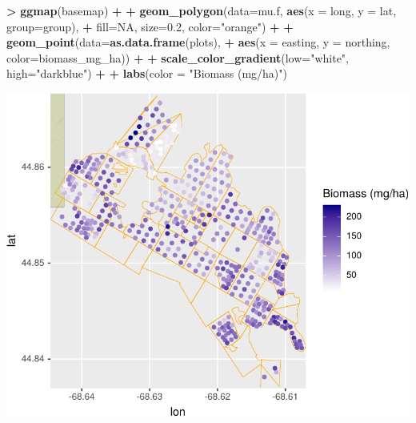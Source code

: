 \documentclass[]{krantz}
\makeatletter
\newenvironment{Shaded}{\begin{snugshade}}{\end{snugshade}}
\newcommand{\DataTypeTok}[1]{\textcolor[rgb]{0.27,0.27,0.27}{#1}}
\newcommand{\FloatTok}[1]{\textcolor[rgb]{0.06,0.06,0.06}{#1}}
\newcommand{\KeywordTok}[1]{\textcolor[rgb]{0.27,0.27,0.27}{\textbf{#1}}}
\newcommand{\NormalTok}[1]{#1}
\newcommand{\OperatorTok}[1]{\textcolor[rgb]{0.43,0.43,0.43}{\textbf{#1}}}
\newcommand{\OtherTok}[1]{\textcolor[rgb]{0.37,0.37,0.37}{#1}}
\newcommand{\StringTok}[1]{\textcolor[rgb]{0.5,0.5,0.5}{#1}}
\newenvironment{kframe}{%
\medskip{}
\setlength{\fboxsep}{.8em}
 \def\at@end@of@kframe{}%
 \ifinner\ifhmode%
  \def\at@end@of@kframe{\end{minipage}}%
  \begin{minipage}{\columnwidth}%
 \fi\fi%
 \def\FrameCommand##1{\hskip\@totalleftmargin \hskip-\fboxsep
 \colorbox{shadecolor}{##1}\hskip-\fboxsep
     \hskip-\linewidth \hskip-\@totalleftmargin \hskip\columnwidth}%
 \MakeFramed {\advance\hsize-\width
   \@totalleftmargin\z@ \linewidth\hsize
   \@setminipage}}%
 {\par\unskip\endMakeFramed%
 \at@end@of@kframe}
\renewenvironment{Shaded}{\begin{kframe}}{\end{kframe}}
\makeatother
\begin{document}
\begin{Shaded}
\begin{Highlighting}[]
\OperatorTok{>}\StringTok{ }\KeywordTok{ggmap}\NormalTok{(basemap) }\OperatorTok{+}
\OperatorTok{+}\StringTok{     }\KeywordTok{geom_polygon}\NormalTok{(}\DataTypeTok{data=}\NormalTok{mu.f, }\KeywordTok{aes}\NormalTok{(}\DataTypeTok{x =}\NormalTok{ long, }\DataTypeTok{y =}\NormalTok{ lat, }\DataTypeTok{group=}\NormalTok{group), }
\OperatorTok{+}\StringTok{                  }\DataTypeTok{fill=}\OtherTok{NA}\NormalTok{, }\DataTypeTok{size=}\FloatTok{0.2}\NormalTok{, }\DataTypeTok{color=}\StringTok{"orange"}\NormalTok{) }\OperatorTok{+}
\OperatorTok{+}\StringTok{     }\KeywordTok{geom_point}\NormalTok{(}\DataTypeTok{data=}\KeywordTok{as.data.frame}\NormalTok{(plots), }
\OperatorTok{+}\StringTok{                }\KeywordTok{aes}\NormalTok{(}\DataTypeTok{x =}\NormalTok{ easting, }\DataTypeTok{y =}\NormalTok{ northing, }\DataTypeTok{color=}\NormalTok{biomass_mg_ha)) }\OperatorTok{+}\StringTok{ }
\OperatorTok{+}\StringTok{     }\KeywordTok{scale_color_gradient}\NormalTok{(}\DataTypeTok{low=}\StringTok{"white"}\NormalTok{, }\DataTypeTok{high=}\StringTok{"darkblue"}\NormalTok{) }\OperatorTok{+}
\OperatorTok{+}\StringTok{     }\KeywordTok{labs}\NormalTok{(}\DataTypeTok{color =} \StringTok{"Biomass (mg/ha)"}\NormalTok{)}
\end{Highlighting}
\end{Shaded}

\includegraphics{bookdown_files/figure-latex/unnamed-chunk-191-1.pdf}
\end{document}
